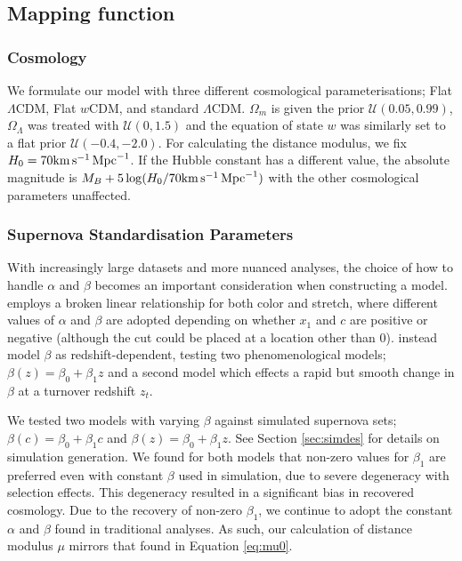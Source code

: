 \documentclass[a4paper,fleqn,usenatbib]{emulateapj}
\newcommand{\kmsmpc}{{\rm km}\,{\rm s}^{-1}\,{\rm Mpc}^{-1}}
\newcommand{\rubin}{\citetalias{Rubin2015}}
\begin{document}
\subsection{Mapping function}

\subsubsection{Cosmology}

We formulate our model with three different cosmological parameterisations; Flat $\Lambda$CDM, Flat $w$CDM, and standard $\Lambda$CDM. $\Omega_m$ is given the prior $\mathcal{U}(0.05, 0.99)$, $\Omega_\Lambda$ was treated with $\mathcal{U}(0, 1.5)$ and the equation of state $w$ was similarly set to a flat prior $\mathcal{U}(-0.4, -2.0)$. For calculating the distance modulus, we fix $H_0 = 70 \kmsmpc $. If the Hubble constant has a different value, the absolute magnitude is $M_B + 5\log(H_0/70 \kmsmpc )$ with the other cosmological parameters unaffected.

\subsubsection{Supernova Standardisation Parameters}

With increasingly large datasets and more nuanced analyses, the choice of how to handle $\alpha$ and $\beta$ becomes an important consideration when constructing a model. {\rubin} employs a broken linear relationship for both color and stretch, where different values of $\alpha$ and $\beta$ are adopted depending on whether $x_1$ and $c$ are positive or negative (although the cut could be placed at a location other than 0). \citet{Shariff2016} instead model $\beta$ as redshift-dependent, testing two phenomenological models; $\beta(z) = \beta_0 + \beta_1 z$ and a second model which effects a rapid but smooth change in $\beta$ at a turnover redshift $z_t$.

We tested two models with varying $\beta$ against simulated supernova sets; $\beta(c) = \beta_0 + \beta_1 c$ and $\beta(z) = \beta_0 + \beta_1 z$. See Section \ref{sec:simdes} for details on simulation generation. We found for both models that non-zero values for $\beta_1$ are preferred even with constant $\beta$ used in simulation, due to severe degeneracy with selection effects. This degeneracy resulted in a significant bias in recovered cosmology. Due to the recovery of non-zero $\beta_1$, we continue to adopt the constant $\alpha$ and $\beta$ found in traditional analyses. As such, our calculation of distance modulus $\mu$ mirrors that found in Equation \eqref{eq:mu0}.
\end{document}
